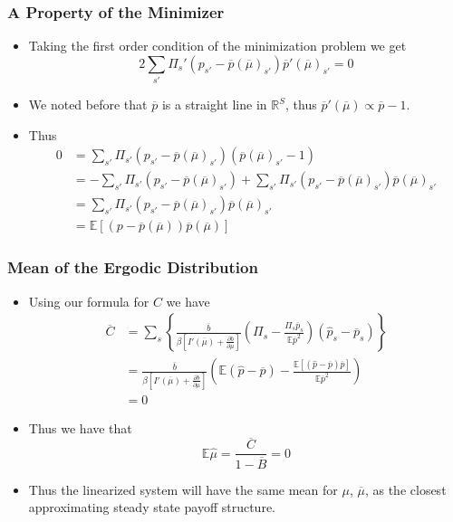 \documentclass{beamer}
\newcommand{\EE}{\mathbb E}
\newcommand{\barB}{{\overline B}}
\newcommand{\barC}{{\overline C}}
\newcommand{\pbar}{{\overline p}}
\newcommand{\bbar}{{\overline b}}
\newcommand{\mubar}{{\overline \mu}}
\begin{document}
\begin{frame}
	\frametitle{A Property of the Minimizer}
	\begin{itemize}
		\item Taking the first order condition of the minimization problem we get 
		\[
			2\sum_{s'}\Pi_s'( p_{s'}-\pbar(\mubar)_{s'}) \pbar'(\mubar)_{s'} = 0
		\]
		\item  We noted before that $\pbar$ is a straight line in $\mathbb R^S$, thus $\pbar'(\mubar)\propto\pbar-1$.
		\item  Thus
		\begin{equation}
	\begin{split}
		0 &= \sum_{s'}\Pi_{s'}( p_{s'} - \pbar(\mubar)_{s'})(\pbar(\mubar)_{s'}-1)\\
		&= -\sum_{s'}\Pi_{s'}( p_{s'}-\pbar(\mubar)_{s'}) + \sum_{s'}\Pi_{s'}( p_{s'}-\pbar(\mubar)_{s'})\pbar(\mubar)_{s'}\\
		&= \sum_{s'}\Pi_{s'}( p_{s'}-\pbar(\mubar)_{s'})\pbar(\mubar)_{s'}\\
		&=\EE\left[( p-\pbar(\mubar))\pbar(\mubar)\right]
	\end{split}
\end{equation} 
	\end{itemize}
\end{frame}

\begin{frame}
	\frametitle{Mean of the Ergodic Distribution}
	\begin{itemize}
		\item  Using our formula for $C$ we have
		\begin{equation}
\begin{split}
	\barC &= \sum_s\left\{\frac{\bbar}{\beta\left[I'(\mubar)+\frac{\partial b}{\partial\mu}\right]}\left(\Pi_s - \frac{\Pi_s\pbar_s}{\EE\pbar^2}\right)(\hat p_s-\pbar_s)\right\}\\
	&=\frac{\bbar}{\beta\left[I'(\mubar)+\frac{\partial b}{\partial\mu}\right]}\left(\EE(\hat p-\pbar) -\frac{\EE\left[(\hat p-\pbar)\pbar\right]}{\EE\pbar^2}\right)\\
	&= 0 
\end{split}
\end{equation}
		\item  Thus we have that 
		\[
			\EE\hat\mu = \frac{\barC}{1-\barB}  = 0
		\]
		\item Thus the linearized system will have the same mean for $\mu$, $\mubar$, as the closest approximating steady state payoff structure.
	\end{itemize}
\end{frame}
\end{document}
